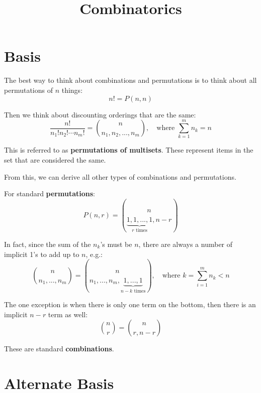 \documentclass{article}
\title{Combinatorics}
\begin{document}
    \maketitle

    \section{Basis}

    The best way to think about combinations and permutations is to think about all permutations of $n$ things: \begin{equation}
        n! = P(n, n)
    \end{equation}

    Then we think about discounting orderings that are the same: \begin{equation}
        \frac{n!}{n_1! n_2! \cdots n_m!} = {n \choose n_1, n_2, ..., n_m}, \quad \text{where } \sum_{k = 1}^m{n_k} = n
    \end{equation}

    This is referred to as \textbf{permutations of multisets}. These represent items in the set that are considered the same.

    From this, we can derive all other types of combinations and permutations.

    For standard \textbf{permutations}: \begin{equation}
        P(n, r) = {n \choose \underbrace{1, 1, ..., 1}_{r \text{ times}}, n - r}
    \end{equation}

    In fact, since the sum of the $n_k$'s must be $n$, there are always a number of implicit 1's to add up to $n$, e.g.: \begin{equation}
        {n \choose n_1, ..., n_m} = {n \choose n_1, ..., n_m, \underbrace{1, ..., 1}_{n - k \text{ times}}}, \quad \text{where } k = \sum_{i = 1}^m{n_k} < n
    \end{equation}

    The one exception is when there is only one term on the bottom, then there is an implicit $n - r$ term as well: \begin{equation}
        {n \choose r} = {n \choose r, n - r}
    \end{equation}

    These are standard \textbf{combinations}.
    
    \section{Alternate Basis}
\end{document}
